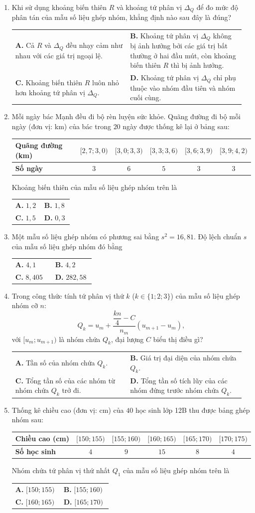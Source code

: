 \documentclass[12pt,a4paper]{article}
\makeatletter
\newcommand{\bonpa}[4]{\par\nobreak\smallskip\nobreak\noindent
\begin{tabular}{@{}p{0.48\linewidth}p{0.48\linewidth}@{}}
\textbf{A.} #1 & \textbf{B.} #2\\[7pt]
\textbf{C.} #3 & \textbf{D.} #4\end{tabular}}
\makeatother
\begin{document}
\begin{enumerate}
\item Khi sử dụng khoảng biến thiên $R$ và khoảng tứ phân vị $\Delta_Q$ để đo mức độ phân tán của mẫu số liệu ghép nhóm, khẳng định nào sau đây là đúng?
\bonpa{Cả $R$ và $\Delta_Q$ đều nhạy cảm như nhau với các giá trị ngoại lệ.}{Khoảng tứ phân vị $\Delta_Q$ không bị ảnh hưởng bởi các giá trị bất thường ở hai đầu mút, còn khoảng biến thiên $R$ thì bị ảnh hưởng.}{Khoảng biến thiên $R$ luôn nhỏ hơn khoảng tứ phân vị $\Delta_Q$.}{Khoảng tứ phân vị $\Delta_Q$ chỉ phụ thuộc vào nhóm đầu tiên và nhóm cuối cùng.}

\item Mỗi ngày bác Mạnh đều đi bộ rèn luyện sức khỏe. Quãng đường đi bộ mỗi ngày (đơn vị: km) của bác trong $20$ ngày được thống kê lại ở bảng sau:
\begin{center}
\begin{tabular}{|l|c|c|c|c|c|}
\hline
\textbf{Quãng đường (km)} & $[2{,}7; 3{,}0)$ & $[3{,}0; 3{,}3)$ & $[3{,}3; 3{,}6)$ & $[3{,}6; 3{,}9)$ & $[3{,}9; 4{,}2)$ \\ \hline
\textbf{Số ngày} & $3$ & $6$ & $5$ & $3$ & $3$ \\ \hline
\end{tabular}
\end{center}
Khoảng biến thiên của mẫu số liệu ghép nhóm trên là
\bonpa{$1{,}2$}{$1{,}8$}{$1{,}5$}{$0{,}3$}

\item Một mẫu số liệu ghép nhóm có phương sai bằng $s^2 = 16{,}81$. Độ lệch chuẩn $s$ của mẫu số liệu ghép nhóm đó bằng
\bonpa{$4{,}1$}{$4{,}2$}{$8{,}405$}{$282{,}58$}

\item Trong công thức tính tứ phân vị thứ $k$ ($k \in \{1; 2; 3\}$) của mẫu số liệu ghép nhóm cỡ $n$:
\[
Q_k = u_m + \dfrac{\dfrac{kn}{4} - C}{n_m}(u_{m+1} - u_m),
\]
với $[u_m; u_{m+1})$ là nhóm chứa $Q_k$, đại lượng $C$ biểu thị điều gì?
\bonpa{Tần số của nhóm chứa $Q_k$.}{Giá trị đại diện của nhóm chứa $Q_k$.}{Tổng tần số của các nhóm từ nhóm chứa $Q_k$ trở đi.}{Tổng tần số tích lũy của các nhóm đứng trước nhóm chứa $Q_k$.}

\item Thống kê chiều cao (đơn vị: cm) của $40$ học sinh lớp 12B thu được bảng ghép nhóm sau:
\begin{center}
\begin{tabular}{|l|c|c|c|c|c|}
\hline
\textbf{Chiều cao (cm)} & $[150; 155)$ & $[155; 160)$ & $[160; 165)$ & $[165; 170)$ & $[170; 175)$ \\ \hline
\textbf{Số học sinh} & $4$ & $9$ & $15$ & $8$ & $4$ \\ \hline
\end{tabular}
\end{center}
Nhóm chứa tứ phân vị thứ nhất $Q_1$ của mẫu số liệu ghép nhóm trên là
\bonpa{$[150; 155)$}{$[155; 160)$}{$[160; 165)$}{$[165; 170)$}
\end{enumerate}
\end{document}
